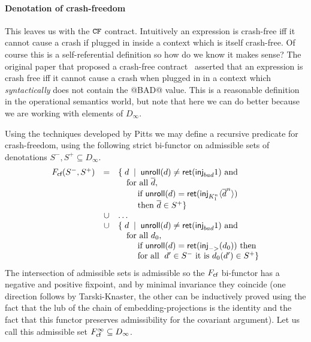 \paragraph{Denotation of crash-freedom}

This leaves us with the ${\tt CF}$ contract. Intuitively an expression is crash-free iff it cannot
cause a crash if plugged in inside a context which is itself crash-free. Of course this is a 
self-referential definition so how do we know it makes sense? The original paper that proposed
a crash-free contract~\cite{xu+:contracts} asserted that an expression is crash free iff it 
cannot cause a crash when plugged in in a context which {\em syntactically} does not contain the
@BAD@ value. This is a reasonable definition in the operational semantics world, but note that
here we can do better because we are working with elements of $D_\infty$. 

Using the techniques developed by Pitts we may define a recursive predicate for crash-freedom,
using the following strict bi-functor on admissible sets of 
denotations $S^{-},S^{+} \subseteq D_\infty$.
{\setlength{\arraycolsep}{2pt}
\[\begin{array}{rcl}
   F_{\textsf{cf}}(S^{-},S^{+}) & = & \{\;d\;\mid\;\mathsf{unroll}(d) \neq \mathsf{ret}(\mathsf{inj}_{bad} 1 ) \mbox{ and } \\ 
                      &    & \quad \mbox{for all } \overline{d}, \\ 
                      &    & \quad\quad\mbox{ if } \mathsf{unroll}(d) = \mathsf{ret}(\mathsf{inj}_{K_1^n}\langle\overline{d}^{n}\rangle) \\ 
                      &    & \quad\quad\mbox{ then } \overline{d} \in S^{+} \} \\ 
                   & \cup & \ldots \\ 
                   & \cup & \{\;d\;\mid\;\mathsf{unroll}(d) \neq \mathsf{ret}(\mathsf{inj}_{bad} 1 ) \mbox{ and } \\ 
                   &      & \quad \mbox{for all } d_0, \\
                   &      & \quad\quad\mbox{ if } \mathsf{unroll}(d) = \mathsf{ret}(\mathsf{inj}_{->}(d_0)) \mbox{ then } \\ 
                   &      & \quad\quad\mbox{ for all }\;d' \in S^{-} \mbox{ it is } d_0(d') \in S^{+} \}  \\
\end{array}\]}
The intersection of admissible sets is admissible so the $F_{\textsf{cf}}$ bi-functor has a negative and positive fixpoint, and by minimal 
invariance they coincide (one direction follows by Tarski-Knaster, the other can be inductively proved using the fact that the 
lub of the chain of embedding-projections is the identity and the fact that this 
functor preserves admissibility for the covariant argument). Let us call this admissible set $F_{\textsf{cf}}^{\infty} \subseteq D_{\infty}$.


